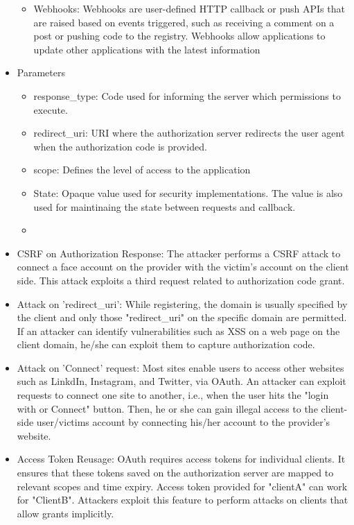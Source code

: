 \begin{itemize}
\begin{itemize}
        \item Webhooks: Webhooks are user-defined HTTP callback or push APIs that are raised based on events triggered, such as receiving a comment on a post or pushing code to the registry. Webhooks allow applications to update other applications with the latest information
    \end{itemize}
    \item Parameters
    \begin{itemize}
        \item response\_type: Code used for informing the server which permissions to execute.
        \item redirect\_uri: URI where the authorization server redirects the user agent when the authorization code is provided.
        \item scope: Defines the level of access to the application
        \item State: Opaque value used for security implementations. The value is also used for maintinaing the state between requests and callback.
        \item 
    \end{itemize}
    \item CSRF on Authorization Response: The attacker performs a CSRF attack to connect a face account on the provider with the victim's account on the client side. This attack exploits a third request related to authorization code grant.
    \item Attack on 'redirect\_uri': While registering, the domain is usually specified by the client and only those "redirect\_uri" on the specific domain are permitted. If an attacker can identify vulnerabilities such as XSS on a web page on the client domain, he/she can exploit them to capture authorization code.
    \item Attack on 'Connect' request: Most sites enable users to access other websites such as LinkdIn, Instagram, and Twitter, via OAuth. An attacker can exploit requests to connect one site to another, i.e., when the user hits the "login with or Connect" button. Then, he or she can gain illegal access to the client-side user/victims account by connecting his/her account to the provider's website.
    \item Access Token Reusage: OAuth requires access tokens for individual clients. It ensures that these tokens saved on the authorization server are mapped to relevant scopes and time expiry. Access token provided for "clientA" can work for "ClientB". Attackers exploit this feature to perform attacks on clients that allow grants implicitly.

\end{itemize}
